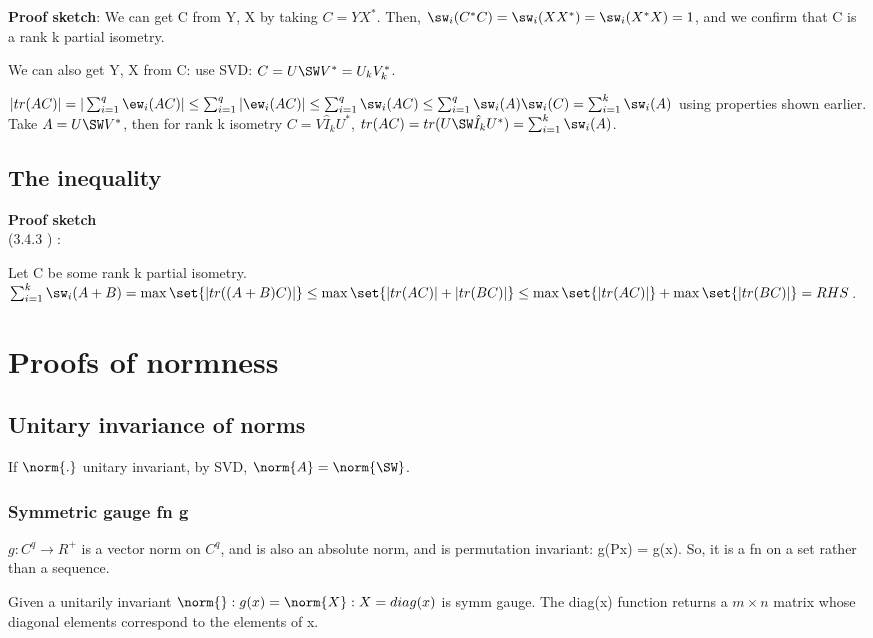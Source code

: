 \documentclass[10pt]{amsart}
\newcommand{\proofSketch}{\textbf{Proof sketch}}
\begin{document}
\proofSketch:
We can get C from Y, X by taking $C = YX^{*}$. Then, $\sw_{i}(C^{*}C) = \sw_{i}(XX^{*})= \sw_{i}(X^{*}X) = 1$, and we confirm that C is a rank k partial isometry.

We can also get Y, X from C: use SVD: $C = U\SW V^{*} = U_{k}V^{*}_{k}$.

$|tr(AC)| = |\sum_{i=1}^{q} \ew_{i}(AC)| \leq \sum_{i=1}^{q} |\ew_{i}(AC)| \\
\leq \sum_{i=1}^{q} \sw_{i}(AC) \leq \sum_{i=1}^{q}\sw_{i}(A) \sw_{i}(C) = \sum_{i=1}^{k}\sw_{i}(A)$ using properties shown earlier. Take $A = U\SW V^{*}$, then for rank k isometry $C = V\hat{I}_{k}U^{*}$, $tr(AC) = tr(U\SW\hat{I}_{k}U^{*}) = \sum_{i=1}^{k}\sw_{i}(A)$.

\subsection{The inequality }
\proofSketch \\
(3.4.3 \cite{hornJohnsonTopics}) :

Let C be some rank k partial isometry. \\
$\sum_{i=1}^{k}\sw_{i}(A+B) = \max \set{|tr((A+B)C)|} \leq \max \set{|tr(AC)| + |tr(BC)|} \\
\leq \max \set{|tr(AC)|} + \max \set{|tr(BC)|} = RHS$.



\section{Proofs of normness}

\subsection{Unitary invariance of norms}
If $\norm{.}$ unitary invariant, by SVD, $\norm{A} = \norm{\SW}$.

\subsubsection{Symmetric gauge fn g}
$g:C^{q} \to R^{+}$ is a vector norm on $C^{q}$, and is also an absolute norm, and is permutation invariant: g(Px) = g(x). So, it is a fn on a set rather than a sequence.

Given a unitarily invariant $\norm{}: g(x) = \norm{X}: X = diag(x)$ is symm gauge. The diag(x) function returns a $m \times n$ matrix whose diagonal elements correspond to the elements of x.
\end{document}
